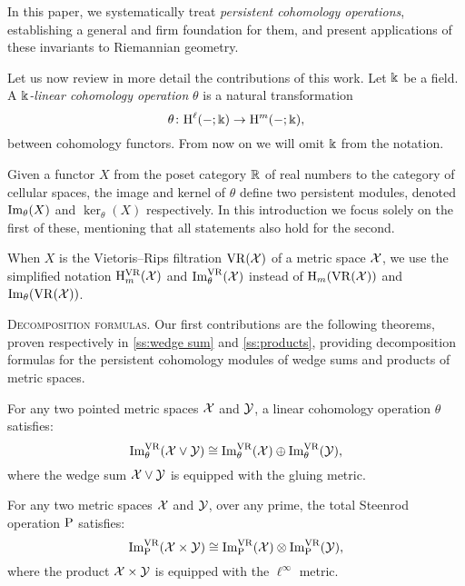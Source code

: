 In this paper, we systematically treat \textit{persistent cohomology operations}, establishing a general and firm foundation for them, and present applications of these invariants to Riemannian geometry.

\medskip Let us now review in more detail the contributions of this work.
Let \(\Bbbk\) be a field.
A \textit{\(\Bbbk\)-linear cohomology operation} \(\theta\) is a natural transformation
\[
\theta \colon \mathrm{H}^\ell(-;\Bbbk) \to \mathrm{H}^m(-;\Bbbk),
\]
between cohomology functors.
From now on we will omit \(\Bbbk\) from the notation.

Given a functor \(X\) from the poset category $\mathbb{R}$ of real numbers to the category of cellular spaces, the image and kernel of \(\theta\) define two persistent modules, denoted \(\operatorname{Im}_\theta(X)\) and \(\ker_\theta(X)\) respectively.
In this introduction we focus solely on the first of these, mentioning that all statements also hold for the second.

When \(X\) is the Vietoris--Rips filtration \(\mathrm{VR}(\mathcal{X})\) of a metric space \(\mathcal{X}\), we use the simplified notation \(\mathrm{H}_m^{\mathrm{VR}}(\mathcal{X})\) and \(\operatorname{Im}_\theta^{\mathrm{VR}}(\mathcal{X})\) instead of \(\mathrm{H}_m(\mathrm{VR}(\mathcal{X}))\) and \(\operatorname{Im}_\theta(\mathrm{VR}(\mathcal{X}))\).


\medskip\noindent\textsc{Decomposition formulas.}
Our first contributions are the following theorems, proven respectively in \cref{ss:wedge sum} and \cref{ss:products}, providing decomposition formulas for the persistent cohomology modules of wedge sums and products of metric spaces.

\begin{introtheorem}\label{thm:decomposition1}
    For any two pointed metric spaces $\mathcal{X}$ and $\mathcal{Y}$, a linear cohomology operation \(\theta\) satisfies:
    \[
    \operatorname{Im}_\theta^{\mathrm{VR}}(\mathcal{X} \vee \mathcal{Y}) \cong \operatorname{Im}_\theta^{\mathrm{VR}}(\mathcal{X}) \oplus \operatorname{Im}_\theta^{\mathrm{VR}}(\mathcal{Y}),
    \]
    where the wedge sum \(\mathcal{X} \vee \mathcal{Y}\) is equipped with the gluing metric.
\end{introtheorem}

\begin{introtheorem}\label{thm:decomposition2}
    For any two metric spaces $\mathcal{X}$ and $\mathcal{Y}$, over any prime, the total Steenrod operation \(\mathrm{P}\) satisfies:
    \[
    \operatorname{Im}^{\mathrm{VR}}_{\mathrm{P}}(\mathcal{X} \times \mathcal{Y}) \cong \operatorname{Im}^{\mathrm{VR}}_{\mathrm{P}}(\mathcal{X}) \otimes \operatorname{Im}^{\mathrm{VR}}_{\mathrm{P}}(\mathcal{Y}),
    \]
    where the product \(\mathcal{X} \times \mathcal{Y}\) is equipped with the \(\ell^\infty\) metric.
\end{introtheorem}

